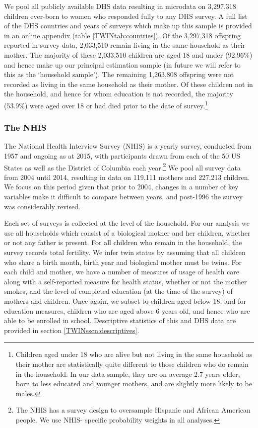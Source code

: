 \documentclass[subeqn]{article}
\begin{document}
\begin{spacing}{1.4}
We pool all publicly available DHS data resulting in microdata on 3,297,318 
children ever-born to women who responded fully to any DHS survey. A full list of 
the DHS countries and years of surveys which make up this sample is provided in
an online appendix (table \ref{TWINtab:countries}).  Of the 3,297,318 offspring 
reported in survey data, 2,033,510 remain living in the same household as their 
mother.  The majority of these 2,033,510 children are aged 18 and under (92.96\%) 
and hence make up our principal estimation sample (in future we will refer to this 
as the `household sample'). The remaining 1,263,808 offspring were not recorded as 
living in the same household as their mother.  Of these children not in the 
household, and hence for whom education is not recorded, the majority (53.9\%) 
were aged over 18 or had died prior to the date of survey.\footnote{Children aged 
under 18 who are alive but not living in the same household as their mother are 
statistically quite different to those children who do remain in the household. 
In our data sample, they are on average 2.7 years older, born to less educated 
and younger mothers, and are slightly more likely to be males.}

\subsubsection{The NHIS}
The National Health Interview Survey (NHIS) is a yearly survey, conducted from 
1957 and ongoing as at 2015, with participants drawn from each of the 50 US 
States as well as the District of Columbia each year.\footnote{The NHIS has a
survey design to oversample Hispanic and African American people.  We use NHIS-%
specific probability weights in all analyses.}  We pool all survey data from 
2004 until 2014, resulting in data on 119,111 mothers and 227,213 children. We 
focus on this period given that prior to 2004, changes in a number of key 
variables make it difficult to compare between years, and post-1996 the survey 
was considerably revised.

Each set of surveys is collected at the level of the household.  For our 
analysis we use all households which consist of a biological mother and her 
children, whether or not any father is present.  For all children who remain in
the household, the survey records total fertility.  We infer twin status by
assuming that all children who share a birth month, birth year and biological
mother must be twins.  For each child and mother, we have a number of measures
of usage of health care along with a self-reported measure for health status, 
whether or not the mother smokes, and the level of completed education (at the 
time of the survey) of mothers and children.  Once again, we subset to children
aged below 18, and for education measures, children who are aged above 6 years
old, and hence who are able to be enrolled in school.  Descriptive statistics of
this and DHS data are provided in section \ref{TWINsscn:descriptives}.


\end{spacing}
\end{document}
